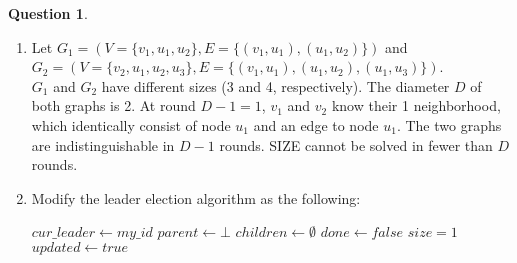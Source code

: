 \documentclass{amsart}
\theoremstyle{definition}
\newtheorem{question}{Question}
\begin{document}
\newpage
\begin{question}
  \begin{enumerate}[label={(\alph*)}]
  \item Let $G_1 = (V=\{v_1, u_1, u_2\}, E=\{(v_1, u_1), (u_1, u_2)\})$ and
    \\$G_2 = (V=\{v_2, u_1, u_2, u_3\}, E=\{(v_1, u_1), (u_1, u_2), (u_1, u_3)\})$.
    \\$G_1$ and $G_2$ have different sizes (3 and 4, respectively). The diameter $D$ of both graphs is 2. At round $D-1 = 1$, $v_1$ and $v_2$ know their 1 neighborhood, which identically consist of node $u_1$ and an edge to node $u_1$. The two graphs are indistinguishable in $D-1$ rounds. SIZE cannot be solved in fewer than $D$ rounds. 
    \item Modify the leader election algorithm as the following:
      \begin{algorithm}[h]
        \DontPrintSemicolon%
        $cur\_leader \gets my\_id$\;
        $parent \gets \bot$\;
        $children \gets \emptyset$\;
        $done \gets false$\;
        $size = 1$\;
        $updated \gets true$\;
      \end{algorithm}
    
  \end{enumerate}
\end{question}
\end{document}
